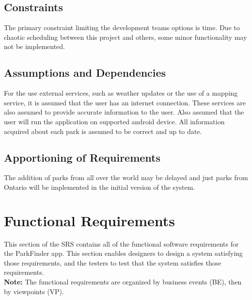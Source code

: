 \documentclass[titlepage]{article}
\begin{document}
\subsection{Constraints}%
\label{sub:constraints}
The primary constraint limiting the development teams options is time. Due to chaotic scheduling
between this project and others, some minor functionality may not be implemented.

\subsection{Assumptions and Dependencies}%
\label{sub:assumptions_and_dependencies}
For the use external services, such as weather updates or the use of a mapping service, it is
assumed that the user has an internet connection. These services are also assumed to provide
accurate information to the user. Also assumed that the user will run the application on supported
android device. All information acquired about each park is assumed to be correct and up to date. 

\subsection{Apportioning of Requirements}%
\label{sub:apportioning_of_requirements}
The addition of parks from all over the world may be delayed and just parks from Ontario will be
implemented in the initial version of the system.


\section{Functional Requirements}%
\label{sec:functional_requirements}
This section of the SRS contains all of the functional software requirements for the ParkFinder app.
This section enables designers to design a system satisfying those requirements, and the testers to
test that the system satisfies those requirements.\\
\textbf{Note: } The functional requirements are organized by business events (BE), then by
viewpoints (VP).
\end{document}
